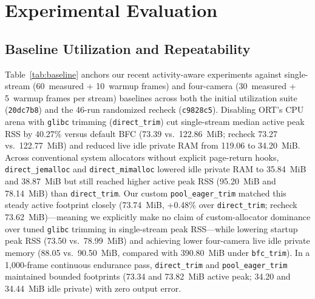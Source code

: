 \documentclass[sigconf,screen,nonacm]{acmart}
\begin{document}
\section{Experimental Evaluation}

\subsection{Baseline Utilization and Repeatability}
Table~\ref{tab:baseline} anchors our recent activity-aware experiments against single-stream (60~measured + 10~warmup frames) and four-camera (30~measured + 5~warmup frames per stream) baselines across both the initial utilization suite (\texttt{20dc7b8}) and the 46-run randomized recheck (\texttt{c9828c5}). Disabling ORT's CPU arena with \texttt{glibc} trimming (\texttt{direct\_\allowbreak trim}) cut single-stream median active peak RSS by 40.27\% versus default BFC (73.39 vs.\ 122.86~MiB; recheck 73.27 vs.\ 122.77~MiB) and reduced live idle private RAM from 119.06 to 34.20~MiB. Across conventional system allocators without explicit page-return hooks, \texttt{direct\_\allowbreak jemalloc} and \texttt{direct\_\allowbreak mimalloc} lowered idle private RAM to 35.84~MiB and 38.87~MiB but still reached higher active peak RSS (95.20~MiB and 78.14~MiB) than \texttt{direct\_\allowbreak trim}. Our custom \texttt{pool\_\allowbreak eager\_\allowbreak trim} matched this steady active footprint closely (73.74~MiB, +0.48\% over \texttt{direct\_\allowbreak trim}; recheck 73.62~MiB)---meaning we explicitly make no claim of custom-allocator dominance over tuned \texttt{glibc} trimming in single-stream peak RSS---while lowering startup peak RSS (73.50 vs.\ 78.99~MiB) and achieving lower four-camera live idle private memory (88.05 vs.\ 90.50~MiB, compared with 390.80~MiB under \texttt{bfc\_\allowbreak trim}). In a 1,000-frame continuous endurance pass, \texttt{direct\_\allowbreak trim} and \texttt{pool\_\allowbreak eager\_\allowbreak trim} maintained bounded footprints (73.34 and 73.82~MiB active peak; 34.20 and 34.44~MiB idle private) with zero output error.
\end{document}
